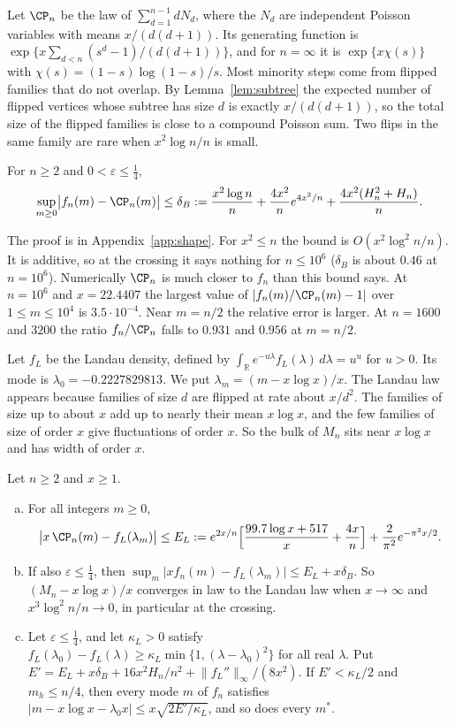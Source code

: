 Let $\CP_n$ be the law of $\sum_{d=1}^{n-1}dN_d$, where the $N_d$ are
independent Poisson variables with means $x/(d(d+1))$. Its generating
function is $\exp\{x\sum_{d<n}(s^d-1)/(d(d+1))\}$, and for $n=\infty$ it is
$\exp\{x\chi(s)\}$ with $\chi(s)=(1-s)\log(1-s)/s$. Most minority steps come
from flipped families that do not overlap. By Lemma~\ref{lem:subtree} the
expected number of flipped vertices whose subtree has size $d$ is exactly
$x/(d(d+1))$, so the total size of the flipped families is close to a
compound Poisson sum. Two flips in the same family are rare when
$x^2\log n/n$ is small.

\begin{theorem}\label{thm:cp}
For $n\ge2$ and $0<\varepsilon\le\frac14$,
\[
 \sup_{m\ge0}\bigl\lvert f_n(m)-\CP_n(m)\bigr\rvert\le\delta_B
 :=\frac{x^2\log n}{n}+\frac{4x^2}{n}e^{4x^2/n}+\frac{4x^2(H_n^2+H_n)}{n}.
\]
\end{theorem}

The proof is in Appendix~\ref{app:shape}. For $x^2\le n$ the bound is
$O(x^2\log^2n/n)$. It is additive, so at the crossing it says nothing for
$n\le10^6$ ($\delta_B$ is about $0.46$ at $n=10^6$). Numerically $\CP_n$ is
much closer to $f_n$ than this bound says. At $n=10^6$ and $x=22.4407$ the
largest value of $\lvert f_n(m)/\CP_n(m)-1\rvert$ over $1\le m\le10^4$ is
$3.5\cdot10^{-4}$. Near $m=n/2$ the relative error is larger. At $n=1600$
and $3200$ the ratio $f_n/\CP_n$ falls to $0.931$ and $0.956$ at $m=n/2$.

Let $f_L$ be the Landau density, defined by
$\int_{\mathbb R}e^{-u\lambda}f_L(\lambda)\,d\lambda=u^u$ for $u>0$. Its mode
is $\lambda_0=-0.2227829813$. We put $\lambda_m=(m-x\log x)/x$. The Landau
law appears because families of size $d$ are flipped at rate about $x/d^2$.
The families of size up to about $x$ add up to nearly their mean $x\log x$,
and the few families of size of order $x$ give fluctuations of order $x$.
So the bulk of $M_n$ sits near $x\log x$ and has width of order $x$.

\begin{theorem}\label{thm:landau}
Let $n\ge2$ and $x\ge1$.
\begin{enumerate}[(a)]
\item For all integers $m\ge0$,
\[
 \bigl\lvert x\,\CP_n(m)-f_L(\lambda_m)\bigr\rvert\le E_L
 :=e^{2x/n}\Bigl[\frac{99.7\log x+517}{x}+\frac{4x}{n}\Bigr]+\frac2{\pi^2}e^{-\pi^2x/2}.
\]
\item If also $\varepsilon\le\frac14$, then
$\sup_m\lvert xf_n(m)-f_L(\lambda_m)\rvert\le E_L+x\delta_B$. So
$(M_n-x\log x)/x$ converges in law to the Landau law when $x\to\infty$ and
$x^3\log^2n/n\to0$, in particular at the crossing.
\item Let $\varepsilon\le\frac14$, and let $\kappa_L>0$ satisfy
$f_L(\lambda_0)-f_L(\lambda)\ge\kappa_L\min\{1,(\lambda-\lambda_0)^2\}$ for
all real $\lambda$. Put
$E'=E_L+x\delta_B+16x^2H_n/n^2+\lVert f_L''\rVert_\infty/(8x^2)$. If
$E'<\kappa_L/2$ and $m_h\le n/4$, then every mode $m$ of $f_n$ satisfies
$\lvert m-x\log x-\lambda_0x\rvert\le x\sqrt{2E'/\kappa_L}$, and so does
every $m^*$.
\end{enumerate}
\end{theorem}

